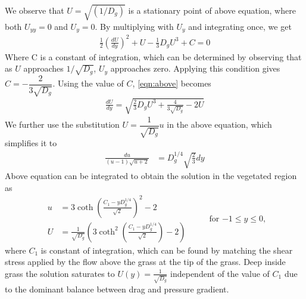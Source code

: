 \documentclass[12pt]{report}   %
\begin{document}
\noindent
We observe that $U = \sqrt{(1/D_g)}$ is a stationary point of above equation, where both $U_{yy}=0$ and $U_y =0 $. By multiplying with $U_y$ and integrating once, we get
\begin{equation}
\begin{split}
 \frac{1}{2} \left( \frac{dU}{dy} \right)^2 +U - \frac{1}{3} D_g U^3 + C = 0
\end{split}
\label{eqn:above}
\end{equation}
Where C is a constant of integration, which can be determined by observing that as $U$ approaches $1/\sqrt{D_g}$, $U_y$ approaches zero. Applying this condition gives $C = -\dfrac{2}{3\sqrt{D_g}}$. Using the value of $C$, \eqref{eqn:above} becomes 
\begin{equation}
\begin{split}
 \frac{dU}{dy} = \sqrt{\frac{2}{3}D_g U^3+\frac{4}{3\sqrt{D_g}}-2U }
\end{split}
\end{equation}
We further use the substitution $U=\dfrac{1}{\sqrt{D_g}} u $ in the above equation, which simplifies it to
\begin{equation}
\begin{split}
 \frac{du}{(u-1)\sqrt{u+2} } &= {D_g^{1/4}}\sqrt{\frac{2}{3}} dy
\end{split}
\end{equation}
Above equation can be integrated to obtain the solution in the vegetated region as
\begin{equation}
\begin{split}
u &= 3 \coth \left(\frac{C_1-y D_g^{1/4}}{\sqrt{2}}  \right)^2-2 \\
U &= \frac{1}{\sqrt{D_g}} \left( 3 \coth^2 \left(\frac{C_1-y D_g^{1/4}}{\sqrt{2}}  \right)-2    \right)
\label{under_grass_sol}
\end{split}
 \hspace{1cm} \text{for $-1\le y\le 0$,}
\end{equation}
where $C_1$ is constant of integration, which can be found by matching the shear stress applied by the flow above the grass at the tip of the grass. Deep inside grass the 
solution saturates to $U(y)=\frac{1}{\sqrt{D_g}}$ independent of the value of $C_1$ due to the dominant balance between drag and pressure gradient.
\end{document}
